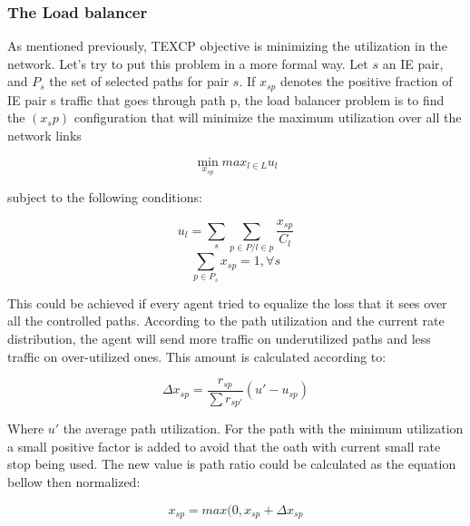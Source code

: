 \subsubsection{The Load balancer}
As mentioned previously, TEXCP objective is minimizing the utilization in the network. Let's try to put this problem in a more formal way. Let $s$ an IE pair, and $P_s$ the set of selected paths for pair $s$. If $x_{sp}$ denotes the positive fraction of IE pair s traffic that goes through path p, the load balancer problem is to find the $(x_sp)$ configuration that will minimize the maximum utilization over all the network links 

\begin{equation}
\min_{x_{sp}} max_{l \in L} u_{l}
\end{equation}

subject to the following conditions:

\begin{equation}
u_l = \sum_{s} \sum_{p \in P / l \in p} \frac {x_{sp} }{C_l}
\end{equation}
\begin{equation}
\sum_{p \in P_{s}} x_{sp} = 1,  \forall s
\end{equation}

This could be achieved if every agent tried to equalize the loss that it sees over all the controlled paths. According to the path utilization and the current rate distribution, the agent will send more traffic on underutilized paths and less traffic on over-utilized ones. This amount is calculated according to:

\begin{equation}
\Delta x_{sp} = \frac{r_{sp}} {\sum r_{sp'}}  (u' - u_{sp}) 
\end{equation}

Where $u'$ the average path utilization. For the path with the minimum utilization a small positive factor is added to avoid that the oath with current small rate stop being used. The new value is path ratio could be calculated as the equation bellow then normalized:

\begin{equation}
x_{sp} = max(0, x_{sp} + \Delta x_{sp}
\end{equation}

